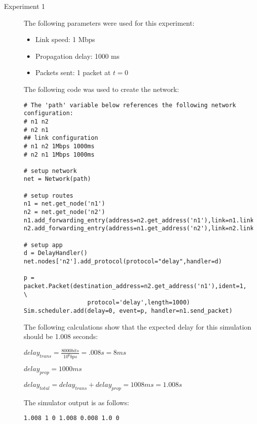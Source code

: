 \documentclass[11pt]{article}
\begin{document}
\begin{description}
\item[Experiment 1] \hfill \break
The following parameters were used for this experiment:

\begin{itemize}
\item Link speed: 1 Mbps
\item Propagation delay: 1000 ms
\item Packets sent: 1 packet at $t = 0$
\end{itemize}

\medskip

The following code was used to create the network:

\medskip

\begin{lstlisting}
# The 'path' variable below references the following network configuration:
# n1 n2
# n2 n1
## link configuration
# n1 n2 1Mbps 1000ms
# n2 n1 1Mbps 1000ms

# setup network
net = Network(path)

# setup routes
n1 = net.get_node('n1')
n2 = net.get_node('n2')
n1.add_forwarding_entry(address=n2.get_address('n1'),link=n1.links[0])
n2.add_forwarding_entry(address=n1.get_address('n2'),link=n2.links[0])

# setup app
d = DelayHandler()
net.nodes['n2'].add_protocol(protocol="delay",handler=d)

p = packet.Packet(destination_address=n2.get_address('n1'),ident=1, \
                  protocol='delay',length=1000)
Sim.scheduler.add(delay=0, event=p, handler=n1.send_packet)
\end{lstlisting}

The following calculations show that the expected delay for this simulation should be 1.008 seconds:

$delay_{trans} = \frac{8000 bits}{10^{6}bps} = .008s = 8ms$

$delay_{prop} = 1000ms$

$delay_{total} = delay_{trans} + delay_{prop} = 1008ms = 1.008s$

\medskip

The simulator output is as follows:

\medskip

\begin{lstlisting}
1.008 1 0 1.008 0.008 1.0 0
\end{lstlisting}

\medskip


\end{description}
\end{document}
